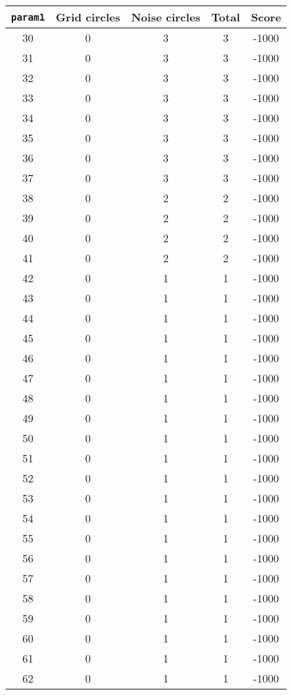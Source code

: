 \documentclass[letterpaper, 12pt]{article}
\begin{document}
\begin{longtable}{|c|c|c|c|c|}
\hline
\textbf{\texttt{param1}} & \textbf{Grid circles} & \textbf{Noise circles} & \textbf{Total} & \textbf{Score} \\
\hline
30 & 0 & 3 & 3 & -1000 \\
\hline
31 & 0 & 3 & 3 & -1000 \\
\hline
32 & 0 & 3 & 3 & -1000 \\
\hline
33 & 0 & 3 & 3 & -1000 \\
\hline
34 & 0 & 3 & 3 & -1000 \\
\hline
35 & 0 & 3 & 3 & -1000 \\
\hline
36 & 0 & 3 & 3 & -1000 \\
\hline
37 & 0 & 3 & 3 & -1000 \\
\hline
38 & 0 & 2 & 2 & -1000 \\
\hline
39 & 0 & 2 & 2 & -1000 \\
\hline
40 & 0 & 2 & 2 & -1000 \\
\hline
41 & 0 & 2 & 2 & -1000 \\
\hline
42 & 0 & 1 & 1 & -1000 \\
\hline
43 & 0 & 1 & 1 & -1000 \\
\hline
44 & 0 & 1 & 1 & -1000 \\
\hline
45 & 0 & 1 & 1 & -1000 \\
\hline
46 & 0 & 1 & 1 & -1000 \\
\hline
47 & 0 & 1 & 1 & -1000 \\
\hline
48 & 0 & 1 & 1 & -1000 \\
\hline
49 & 0 & 1 & 1 & -1000 \\
\hline
50 & 0 & 1 & 1 & -1000 \\
\hline
51 & 0 & 1 & 1 & -1000 \\
\hline
52 & 0 & 1 & 1 & -1000 \\
\hline
53 & 0 & 1 & 1 & -1000 \\
\hline
54 & 0 & 1 & 1 & -1000 \\
\hline
55 & 0 & 1 & 1 & -1000 \\
\hline
56 & 0 & 1 & 1 & -1000 \\
\hline
57 & 0 & 1 & 1 & -1000 \\
\hline
58 & 0 & 1 & 1 & -1000 \\
\hline
59 & 0 & 1 & 1 & -1000 \\
\hline
60 & 0 & 1 & 1 & -1000 \\
\hline
61 & 0 & 1 & 1 & -1000 \\
\hline
62 & 0 & 1 & 1 & -1000 \\

\end{longtable}
\end{document}

